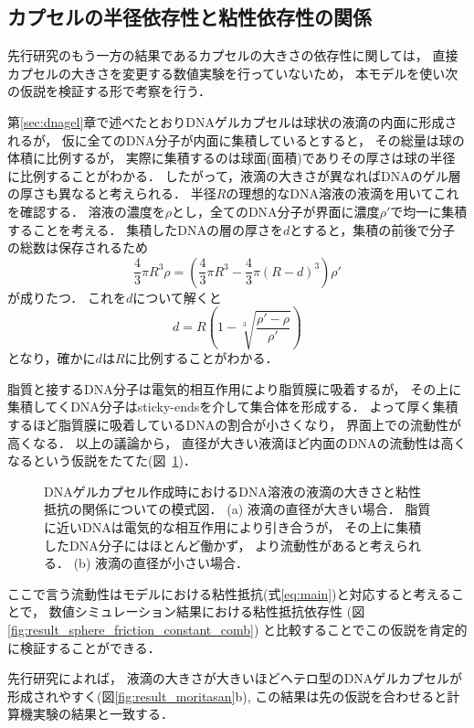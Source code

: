 \subsection{カプセルの半径依存性と粘性依存性の関係}
先行研究のもう一方の結果であるカプセルの大きさの依存性に関しては，
直接カプセルの大きさを変更する数値実験を行っていないため，
本モデルを使い次の仮説を検証する形で考察を行う．

第\ref{sec:dnagel}章で述べたとおりDNAゲルカプセルは球状の液滴の内面に形成されるが，
仮に全てのDNA分子が内面に集積しているとすると，
その総量は球の体積に比例するが，
実際に集積するのは球面(面積)でありその厚さは球の半径に比例することがわかる．
したがって，液滴の大きさが異なればDNAのゲル層の厚さも異なると考えられる．
半径$R$の理想的なDNA溶液の液滴を用いてこれを確認する．
溶液の濃度を$\rho$とし，全てのDNA分子が界面に濃度$\rho'$で均一に集積することを考える．
集積したDNAの層の厚さを$d$とすると，集積の前後で分子の総数は保存されるため
\begin{equation}
    \frac{4}{3}\pi R^3 \rho = \left(\frac{4}{3}\pi R^3-\frac{4}{3}\pi(R-d)^3\right)\rho'
\end{equation}
が成りたつ．
これを$d$について解くと
\begin{equation}
    d = R(1-\sqrt[3]{\frac{\rho'-\rho}{\rho'}})
\end{equation}
となり，確かに$d$は$R$に比例することがわかる．

脂質と接するDNA分子は電気的相互作用により脂質膜に吸着するが，
その上に集積してくDNA分子はsticky-endsを介して集合体を形成する．
よって厚く集積するほど脂質膜に吸着しているDNAの割合が小さくなり，
界面上での流動性が高くなる．
以上の議論から，
直径が大きい液滴ほど内面のDNAの流動性は高くなるという仮説をたてた(図~\ref{fig:size_and_friction})．
\begin{figure}
    \centering
    
    \caption{
        DNAゲルカプセル作成時におけるDNA溶液の液滴の大きさと粘性抵抗の関係についての模式図．
        (a) 液滴の直径が大きい場合．
            脂質に近いDNAは電気的な相互作用により引き合うが，
            その上に集積したDNA分子にはほとんど働かず，
            より流動性があると考えられる．
        (b) 液滴の直径が小さい場合．
    }
    \label{fig:size_and_friction}
\end{figure}
ここで言う流動性はモデルにおける粘性抵抗(式\ref{eq:main})と対応すると考えることで，
数値シミュレーション結果における粘性抵抗依存性
(図\ref{fig:result_sphere_friction_constant_comb})
と比較することでこの仮説を肯定的に検証することができる．

先行研究によれば，
液滴の大きさが大きいほどヘテロ型のDNAゲルカプセルが形成されやすく(図\ref{fig:result_moritasan}b), 
この結果は先の仮説を合わせると計算機実験の結果と一致する．
